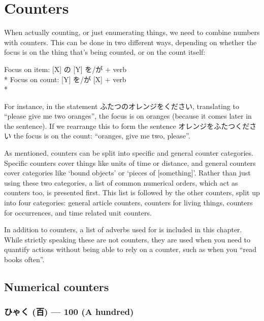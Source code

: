 \documentclass[11pt, b5paper, twoside, openright, onecolumn]{book}
\makeatletter
\newcommand*{\rubystack}[2]{{\relscale{0.5}%
  \begin{tabular}[b]{@{}c@{}}%
    {#1}\\%
   {\textscale{2}{#2}}%
  \end{tabular}}%
}
\DeclareRobustCommand*{\ruby}[2]{%
  \mbox{%
    \setlength{\parskip}{0ex}%
    \BeginAccSupp{method=pdfstringdef,ActualText={#1}}%
      \rubystack{\phantom{#2}}{#1}%
      \llap{%
        \rubystack{#2}{\phantom{#1}}%
      }%
    \EndAccSupp{}%
  }%
}
\renewcommand*{\ruby}[2]{#2 (#1)}%
\newenvironment{exampleblock}{
\setlength{\parindent}{0.6in}
\begin{minipage}[t]{\dimexpr\textwidth-\parindent}}
{\end{minipage}}
\makeatother
\begin{document}
\section{Counters}

When actually counting‚ or just enumerating things‚ we need to combine numbers with counters. This can be done in two different ways‚ depending on whether the focus is on the thing that’s being counted‚ or on the count itself:

\vspace{0.4cm}
\begin{exampleblock}
Focus on item: [X] の [Y] を/が + verb \\* 
Focus on count: [Y] を/が [X] + verb \\* 
\end{exampleblock}
\vspace{0.2cm}

For instance‚ in the statement ふたつのオレンジをください‚ translating to “please give me two oranges”‚ the focus is on oranges (because it comes later in the sentence). If we rearrange this to form the sentence オレンジをふたつください the focus is on the count: “oranges‚ give me two‚ please”.

As mentioned‚ counters can be split into specific and general counter categories. Specific counters cover things like units of time or distance‚ and general counters cover categories like ‘bound objects’ or ‘pieces of [something]’. Rather than just using these two categories‚ a list of common numerical orders‚ which act as counters too‚ is presented first. This list is followed by the other counters‚ split up into four categories: general article counters‚ counters for living things‚ counters for occurrences‚ and time related unit counters.

In addition to counters‚ a list of adverbs used for  is included in this chapter. While strictly speaking these are not counters‚ they are used when you need to quantify actions without being able to rely on a counter‚ such as when you “read books often”.

\subsection{Numerical counters}

\subsubsection{\ruby{百}{ひゃく} — 100 (A hundred)}
\end{document}

